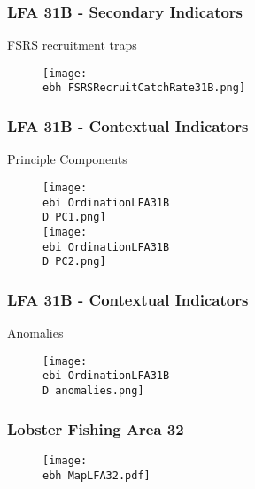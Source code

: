 \documentclass{beamer}
\newcommand{\ebh}{\string~/bio.data/bio.lobster/figures/Assessment/LFA2732/} %
\newcommand{\ebi}{\string~/bio.data/bio.lobster/figures/Assessment/Indicators/} %
\newcommand{\D}{.}
\begin{document}
\begin{frame}
\frametitle{LFA 31B - Secondary Indicators}
FSRS recruitment traps
\begin{figure}
        \begin{center}
            \texttt{[image: \\ebh FSRSRecruitCatchRate31B.png]}
        \end{center}
    \end{figure}
\end{frame}



\begin{frame}
\frametitle{LFA 31B - Contextual Indicators}
Principle Components
\begin{figure}
        \begin{center}
            \texttt{[image: \\ebi OrdinationLFA31B\\D PC1.png]}\\
            \texttt{[image: \\ebi OrdinationLFA31B\\D PC2.png]}
        \end{center}
    \end{figure}
\end{frame}



\begin{frame}
\frametitle{LFA 31B - Contextual Indicators}
Anomalies
\begin{figure}
        \begin{center}
            \texttt{[image: \\ebi OrdinationLFA31B\\D anomalies.png]}
        \end{center}
    \end{figure}
\end{frame}






\begin{frame}
\frametitle{Lobster Fishing Area 32}
\begin{figure}
        \begin{center}
            \texttt{[image: \\ebh MapLFA32.pdf]}
        \end{center}
    \end{figure}
\end{frame}
\end{document}
